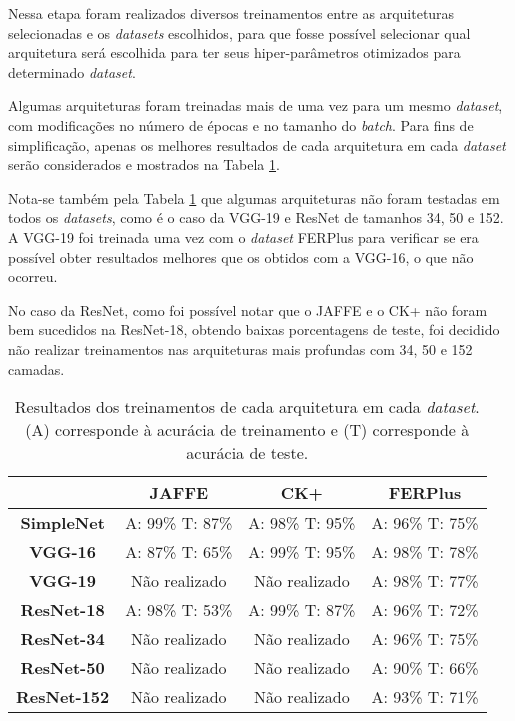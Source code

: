 \documentclass[
12pt,       %
openright,      %
oneside,      %
a4paper,      %
english,      %
french,       %
spanish,      %
brazil        %
]{abntex2}
\begin{document}
Nessa etapa foram realizados diversos treinamentos entre as arquiteturas selecionadas e os \textit{datasets} escolhidos, para que fosse possível selecionar qual arquitetura será escolhida para ter seus hiper-parâmetros otimizados para determinado \textit{dataset}.

Algumas arquiteturas foram treinadas mais de uma vez para um mesmo \textit{dataset}, com modificações no número de épocas e no tamanho do \textit{batch}. Para fins de simplificação, apenas os melhores resultados de cada arquitetura em cada \textit{dataset} serão considerados e mostrados na Tabela \ref{tab:resultados-treinamento}.

Nota-se também pela Tabela \ref{tab:resultados-treinamento} que algumas arquiteturas não foram testadas em todos os \textit{datasets}, como é o caso da VGG-19 e ResNet de tamanhos 34, 50 e 152. A VGG-19 foi treinada uma vez com o \textit{dataset} FERPlus para verificar se era possível obter resultados melhores que os obtidos com a VGG-16, o que não ocorreu.

No caso da ResNet, como foi possível notar que o JAFFE e o CK+ não foram bem sucedidos na ResNet-18, obtendo baixas porcentagens de teste, foi decidido não realizar treinamentos nas arquiteturas mais profundas com 34, 50 e 152 camadas.

\begin{table}[H]
\centering
\caption{Resultados dos treinamentos de cada arquitetura em cada \textit{dataset}. (A) corresponde à acurácia de treinamento e (T) corresponde à acurácia de teste.}
\label{tab:resultados-treinamento}
\begin{tabular}{@{}cccc@{}}
\toprule
                    & \textbf{JAFFE}  & \textbf{CK+}    & \textbf{FERPlus} \\ \midrule
\textbf{SimpleNet}  & A: 99\% T: 87\% & A: 98\% T: 95\% & A: 96\% T: 75\%  \\
\textbf{VGG-16}     & A: 87\% T: 65\% & A: 99\% T: 95\% & A: 98\% T: 78\%  \\
\textbf{VGG-19}     & Não realizado   & Não realizado   & A: 98\% T: 77\%  \\
\textbf{ResNet-18}  & A: 98\% T: 53\% & A: 99\% T: 87\% & A: 96\% T: 72\%  \\
\textbf{ResNet-34}  & Não realizado   & Não realizado   & A: 96\% T: 75\%  \\
\textbf{ResNet-50}  & Não realizado   & Não realizado   & A: 90\% T: 66\%  \\
\textbf{ResNet-152} & Não realizado   & Não realizado   & A: 93\% T: 71\%  \\ \bottomrule
\end{tabular}
\end{table}
\end{document}
